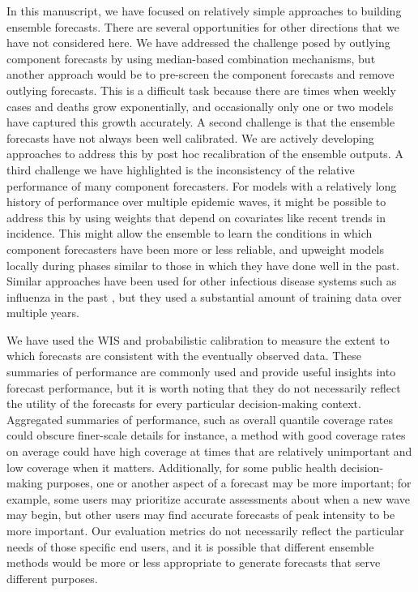 \documentclass[11pt,3p,review,authoryear]{elsarticle}
\begin{document}
In this manuscript, we have focused on relatively simple approaches to building ensemble forecasts. There are several opportunities for other directions that we have not considered here. We have addressed the challenge posed by outlying component forecasts by using median-based combination mechanisms, but another approach would be to pre-screen the component forecasts and remove outlying forecasts. This is a difficult task because there are times when weekly cases and deaths grow exponentially, and occasionally only one or two models have captured this growth accurately.
A second challenge is that the ensemble forecasts have not always been well calibrated. We are actively developing approaches to address this by post hoc recalibration of the ensemble outputs. A third challenge we have highlighted is the inconsistency of the relative performance of many component forecasters. For models with a relatively long history of performance over multiple epidemic waves, it might be possible to address this by using weights that depend on covariates like recent trends in incidence. This might allow the ensemble to learn the conditions in which component forecasters have been more or less reliable, and upweight models locally during phases similar to those in which they have done well in the past. Similar approaches have been used for other infectious disease systems such as influenza in the past \citep[e.g.,][]{ray_feature_weighted_ensembles}, but they used a substantial amount of training data over multiple years.

We have used the WIS and probabilistic calibration to measure the extent to which forecasts are consistent with the eventually observed data. These summaries of performance are commonly used and provide useful insights into forecast performance, but it is worth noting that they do not necessarily reflect the utility of the forecasts for every particular decision-making context. Aggregated summaries of performance, such as overall quantile coverage rates could obscure finer-scale details \textemdash for instance, a method with good coverage rates on average could have high coverage at times that are relatively unimportant and low coverage when it matters. Additionally, for some public health decision-making purposes, one or another aspect of a forecast may be more important; for example, some users may prioritize accurate assessments about when a new wave may begin, but other users may find accurate forecasts of peak intensity to be more important. Our evaluation metrics do not necessarily reflect the particular needs of those specific end users, and it is possible that different ensemble methods would be more or less appropriate to generate forecasts that serve different purposes.
\end{document}

